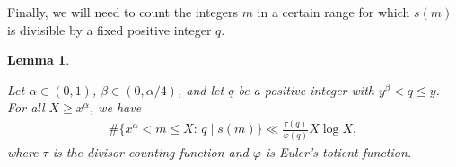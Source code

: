 \documentclass[11pt, reqno]{amsart}
\newtheorem{lemma}[theorem]{Lemma}
\theoremstyle{remark}
\numberwithin{theorem}{section}
\numberwithin{proposition}{section}
\numberwithin{lemma}{section}
\numberwithin{corollary}{section}
\numberwithin{equation}{section}
\numberwithin{conjecture}{section}
\numberwithin{definition}{section}
\begin{document}

Finally, we will need  to count the integers $m$ in a certain range for which $s(m)$ is divisible by a fixed positive integer $q$.

\begin{lemma}\label{Lemma 3-g-old}
	

Let $\alpha\in (0,1)$, $\beta \in (0, \alpha/4)$, and let $q$ be a positive integer with $y^{\beta}<q\leq y $. For all $X\geq x^{\alpha}$, we have 
\begin{align*}
		\#\{x^{\alpha}< m\leq X:\, q\mid s(m)\}\ll \frac{\tau (q)}{\varphi (q)}X \log X,
	\end{align*} where $\tau$ is the divisor-counting function and $\varphi$ is Euler's totient function.
 \end{lemma}
\end{document}

